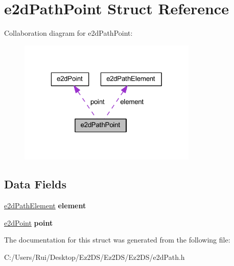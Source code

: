 \hypertarget{structe2d_path_point}{\section{e2d\-Path\-Point Struct Reference}
\label{structe2d_path_point}
}


Collaboration diagram for e2d\-Path\-Point\-:\nopagebreak
\begin{figure}[H]
\begin{center}
\leavevmode
\includegraphics[width=241pt]{structe2d_path_point__coll__graph}
\end{center}
\end{figure}
\subsection*{Data Fields}
\begin{DoxyCompactItemize}
\item 
\hypertarget{structe2d_path_point_a88e514266530010a1a3b08198b3cc763}{\hyperlink{structe2d_path_element}{e2d\-Path\-Element} {\bfseries element}}\label{structe2d_path_point_a88e514266530010a1a3b08198b3cc763}

\item 
\hypertarget{structe2d_path_point_afff60c971a4d4728af80b4753d30c5bf}{\hyperlink{structe2d_point}{e2d\-Point} {\bfseries point}}\label{structe2d_path_point_afff60c971a4d4728af80b4753d30c5bf}

\end{DoxyCompactItemize}


The documentation for this struct was generated from the following file\-:\begin{DoxyCompactItemize}
\item 
C\-:/\-Users/\-Rui/\-Desktop/\-Ez2\-D\-S/\-Ez2\-D\-S/\-Ez2\-D\-S/e2d\-Path.\-h\end{DoxyCompactItemize}
